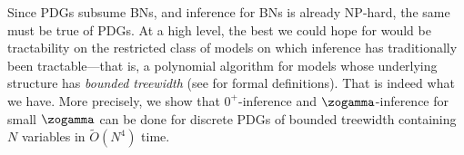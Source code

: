 Since PDGs subsume BNs, and inference for BNs is already NP-hard, the same must be true of PDGs.
At a high level, the best we could hope for would be tractability on the restricted
class of models on which inference has traditionally been tractable---that is, a polynomial algorithm for models whose
underlying structure has \emph{bounded treewidth} (see
 for formal definitions).
That is indeed what we have.  
More precisely, we show that
$0^+$-inference
and $\zogamma$-inference for small $\zogamma$ 
can be done 
for discrete PDGs of bounded treewidth containing $N$ variables in
$\tilde O(N^4)$ 
time.
